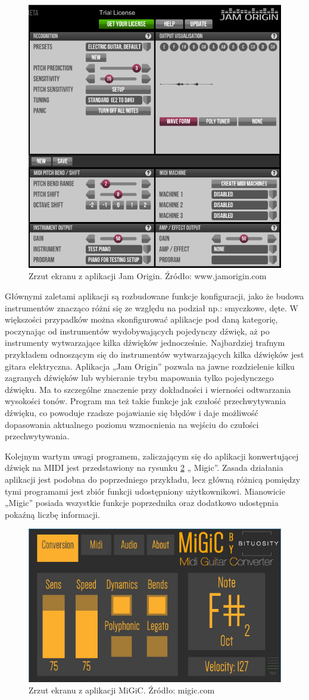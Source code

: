\begin{figure}[h!]
  \centering
  \includegraphics[width=0.5\linewidth]{rys/jamOrigin1}
  \caption{Zrzut ekranu z aplikacji Jam Origin. Źródło: www.jamorigin.com}
  \label{jamOr}
\end{figure}


Głównymi zaletami aplikacji są rozbudowane funkcje konfiguracji, jako że budowa instrumentów znacząco różni się ze względu na podział np.: smyczkowe, dęte. W większości przypadków można skonfigurować aplikacje pod daną kategorię, poczynając od instrumentów wydobywających pojedynczy dźwięk, aż po instrumenty wytwarzające kilka dźwięków jednocześnie. Najbardziej trafnym przykładem odnoszącym się do instrumentów wytwarzających kilka dźwięków jest gitara elektryczna. Aplikacja „Jam Origin” pozwala na jawne rozdzielenie kilku zagranych dźwięków lub wybieranie trybu mapowania tylko pojedynczego dźwięku. Ma to szczególne znaczenie przy dokładności i wierności odtwarzania wysokości tonów. Program ma też takie funkcje jak czułość przechwytywania dźwięku, co powoduje rzadsze pojawianie się błędów i daje możliwość dopasowania aktualnego poziomu wzmocnienia na wejściu do czułości przechwytywania.


Kolejnym wartym uwagi programem, zaliczającym się do aplikacji konwertującej dźwięk na  MIDI  jest przedstawiony na rysunku \ref{migic} „ Migic”. Zasada działania aplikacji jest podobna do poprzedniego przykładu, lecz główną różnicą pomiędzy tymi programami jest zbiór funkcji udostępniony użytkownikowi. Mianowicie „Migic” posiada wszystkie funkcje poprzednika oraz dodatkowo udostępnia pokaźną liczbę informacji.

\begin{figure}[h!]
  \centering
  \includegraphics[width=0.5\linewidth]{rys/MIGIC1}
  \caption{Zrzut ekranu z aplikacji MiGiC. Źródło: migic.com}
  \label{migic}
\end{figure}

